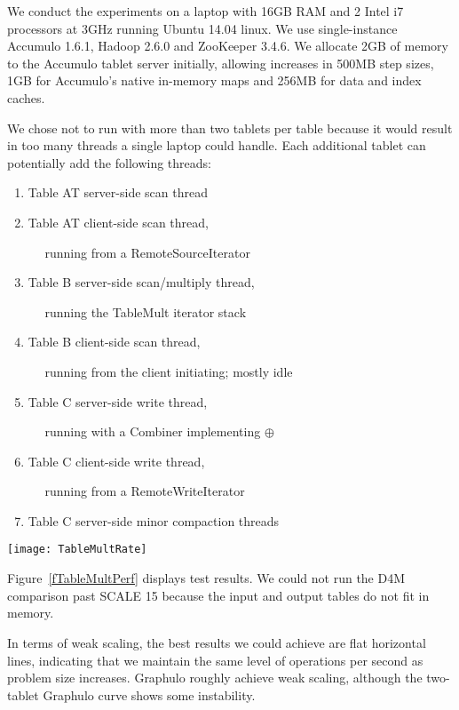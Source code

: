 We conduct the experiments on a laptop with 16GB RAM and 2 Intel i7 processors at 3GHz
running Ubuntu 14.04 linux. We use single-instance Accumulo 1.6.1, Hadoop 2.6.0 and ZooKeeper 3.4.6.
We allocate 2GB of memory to the Accumulo tablet server initially, allowing increases in 500MB step sizes,
1GB for Accumulo's native in-memory maps and 256MB for data and index caches.


We chose not to run with more than two tablets per table because it would result in too many threads 
a single laptop could handle.  Each additional tablet can potentially add the following threads:
\begin{enumerate}
\item Table AT server-side scan thread
\item Table AT client-side scan thread,

$\quad$ running from a RemoteSourceIterator
\item Table B server-side scan/multiply thread,

$\quad$ running the TableMult iterator stack
\item Table B client-side scan thread, 

$\quad$ running from the client initiating; mostly idle
\item Table C server-side write thread,

$\quad$ running with a Combiner implementing $\oplus$
\item Table C client-side write thread,

$\quad$ running from a RemoteWriteIterator
\item Table C server-side minor compaction threads
\end{enumerate}

\begin{figure*}[h]
\centering
\texttt{[image: TableMultRate]}
\caption{Data flow through the TableMult iterator stack}
\label{fTableMultPerf}
\end{figure*}

Figure~\ref{fTableMultPerf} displays test results.
We could not run the D4M comparison past SCALE 15 because 
the input and output tables do not fit in memory.

In terms of weak scaling, the best results we could achieve are flat horizontal lines, 
indicating that we maintain the same level of operations per second as problem size increases.
Graphulo roughly achieve weak scaling, although the two-tablet Graphulo curve 
shows some instability.

